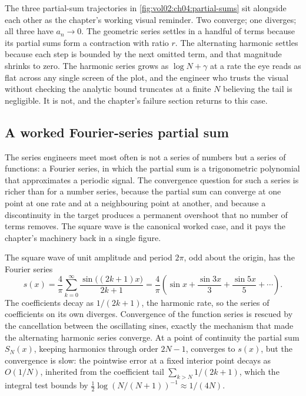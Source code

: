 The three partial-sum trajectories in \autoref{fig:vol02:ch04:partial-sums}
sit alongside each other as the chapter's working visual reminder.
Two converge; one diverges; all three have $a_n \to 0$. The geometric
series settles in a handful of terms because its partial sums form a
contraction with ratio $r$. The alternating harmonic settles because
each step is bounded by the next omitted term, and that magnitude
shrinks to zero. The harmonic series grows as $\log N + \gamma$ at
a rate the eye reads as flat across any single screen of the plot,
and the engineer who trusts the visual without checking the analytic
bound truncates at a finite $N$ believing the tail is negligible. It
is not, and the chapter's failure section returns to this case.

\subsection{A worked Fourier-series partial sum}

The series engineers meet most often is not a series of numbers but a
series of functions: a Fourier series, in which the partial sum is a
trigonometric polynomial that approximates a periodic signal. The
convergence question for such a series is richer than for a number
series, because the partial sum can converge at one point at one rate
and at a neighbouring point at another, and because a discontinuity in
the target produces a permanent overshoot that no number of terms
removes. The square wave is the canonical worked case, and it pays the
chapter's machinery back in a single figure.

The square wave of unit amplitude and period $2\pi$, odd about the
origin, has the Fourier series
\[
s(x) = \frac{4}{\pi} \sum_{k=0}^{\infty} \frac{\sin\bigl((2k+1) x\bigr)}
{2k+1} = \frac{4}{\pi}\left(\sin x + \frac{\sin 3x}{3} +
\frac{\sin 5x}{5} + \cdots\right).
\]
The coefficients decay as $1/(2k+1)$, the harmonic rate, so the series
of coefficients on its own diverges. Convergence of the function series
is rescued by the cancellation between the oscillating sines, exactly
the mechanism that made the alternating harmonic series converge. At a
point of continuity the partial sum $S_{N}(x)$, keeping harmonics
through order $2N-1$, converges to $s(x)$, but the convergence is slow:
the pointwise error at a fixed interior point decays as $O(1/N)$,
inherited from the coefficient tail $\sum_{k > N} 1/(2k+1)$, which the
integral test bounds by $\tfrac{1}{2}\log(N/(N+1))^{-1} \approx
1/(4N)$.

